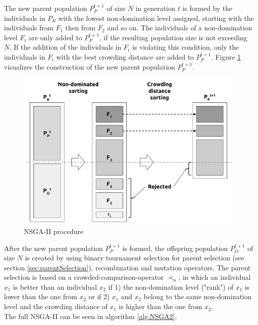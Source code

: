     The new parent population $P_{P}^{t+1}$ of size $N$ in generation $t$ is formed by the individuals in $P_R$ with the lowest non-domination level assigned, starting with the individuals from $F_1$ then from $F_2$ and so on. The individuals of a non-domination level $F_i$ are only added to $P_{P}^{t+1}$, if the resulting population size is not exceeding $N$. If the addition of the individuals in $F_i$ is violating this condition, only the individuals in $F_i$ with the best crowding distance are added to $P_{P}^{t+1}$. Figure \ref{fig:nsga2procedure} visualizes the construction of the new parent population $P_{P}^{t+1}$.\\
    \begin{figure}
        \centering
        \includegraphics[scale=0.3]{./Figures/NSGA2Procedure}
        \caption{NSGA-II procedure\cite{Deb:2002}}
        \label{fig:nsga2procedure}
    \end{figure}
    After the new parent population $P_{P}^{t+1}$ is formed, the offspring population $P_{O}^{t+1}$ of size $N$ is created by using binary tournament selection for parent selection (see section \ref{sec:parentSelection}), recombination and mutation operators. The parent selection is based on a crowded-comparison-operator $\prec_n$, in which an individual $x_1$ is better than an individual $x_2$ if 1) the non-domination level ("rank") of $x_1$ is lower than the one from $x_2$ or if 2) $x_1$ and $x_2$ belong to the same non-domination level and the crowding distance of $x_1$ is higher than the one from $x_2$.\\
    The full NSGA-II can be seen in algorithm \ref{alg:NSGA2}.
